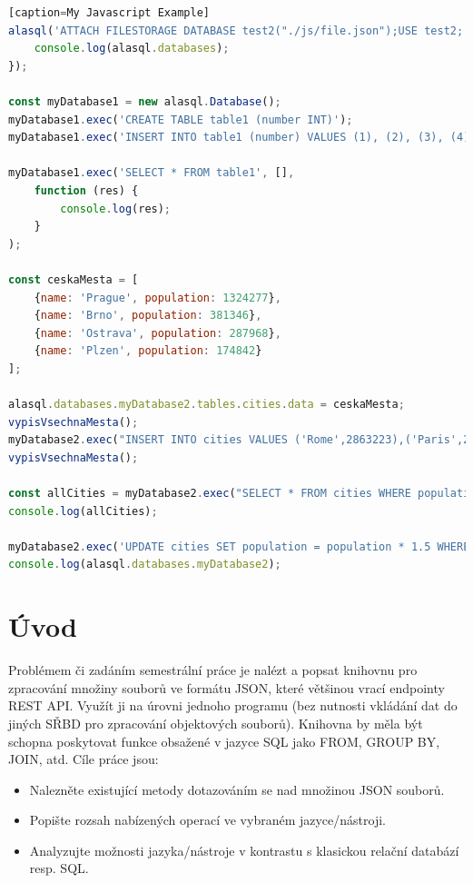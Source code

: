 \documentclass[a4, titlepage]{article}
\begin{document}
\begin{lstlisting}[language=JavaScript][caption=My Javascript Example]
alasql('ATTACH FILESTORAGE DATABASE test2("./js/file.json");USE test2;',function () {
    console.log(alasql.databases);
});

const myDatabase1 = new alasql.Database();
myDatabase1.exec('CREATE TABLE table1 (number INT)');
myDatabase1.exec('INSERT INTO table1 (number) VALUES (1), (2), (3), (4), (5)');

myDatabase1.exec('SELECT * FROM table1', [],
    function (res) {
        console.log(res);
    }
);

const ceskaMesta = [
    {name: 'Prague', population: 1324277},
    {name: 'Brno', population: 381346},
    {name: 'Ostrava', population: 287968},
    {name: 'Plzen', population: 174842}
];

alasql.databases.myDatabase2.tables.cities.data = ceskaMesta;
vypisVsechnaMesta();
myDatabase2.exec("INSERT INTO cities VALUES ('Rome',2863223),('Paris',2249975),('Berlin',3517424),('Madrid',3041579)");
vypisVsechnaMesta();

const allCities = myDatabase2.exec("SELECT * FROM cities WHERE population < 3500000 ORDER BY population DESC");
console.log(allCities);

myDatabase2.exec('UPDATE cities SET population = population * 1.5 WHERE name LIKE "A%"');
console.log(alasql.databases.myDatabase2);
\end{lstlisting}

\newpage

\tableofcontents
\newpage

\section*{Úvod}
Problémem či zadáním semestrální práce je nalézt a popsat knihovnu pro zpracování množiny souborů ve formátu JSON, které většinou vrací endpointy REST API. Využít ji na úrovni jednoho programu (bez nutnosti vkládání dat do jiných SŘBD pro zpracování objektových souborů). Knihovna by měla být schopna poskytovat funkce obsažené v jazyce SQL jako FROM, GROUP BY, JOIN, atd. Cíle práce jsou: 

\begin{itemize}
	\item Nalezněte existující metody dotazováním se nad množinou JSON souborů.
	\item Popište rozsah nabízených operací ve vybraném jazyce/nástroji.
	\item Analyzujte možnosti jazyka/nástroje v kontrastu s klasickou relační databází resp. SQL.
\end{itemize}
\end{document}
